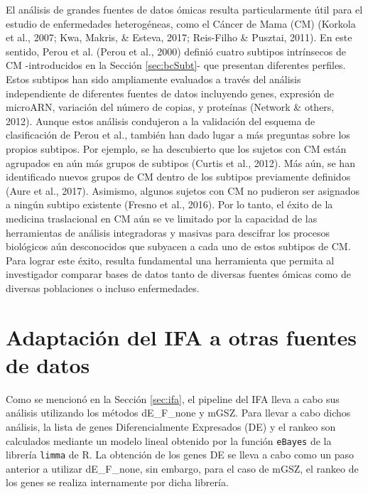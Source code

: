 \documentclass[12pt,twoside]{reedthesis}
\begin{document}
\par

El análisis de grandes fuentes de datos ómicas resulta particularmente útil para el estudio de enfermedades heterogéneas, como el Cáncer de Mama (CM) (Korkola et al., 2007; Kwa, Makris, \& Esteva, 2017; Reis-Filho \& Pusztai, 2011). En este sentido, Perou et al. (Perou et al., 2000) definió cuatro subtipos intrínsecos de CM -introducidos en la Sección \ref{sec:bcSubt}- que presentan diferentes perfiles. Estos subtipos han sido ampliamente evaluados a través del análisis independiente de diferentes fuentes de datos incluyendo genes, expresión de microARN, variación del número de copias, y proteínas (Network \& others, 2012). Aunque estos análisis condujeron a la validación del esquema de clasificación de Perou et al., también han dado lugar a más preguntas sobre los propios subtipos. Por ejemplo, se ha descubierto que los sujetos con CM están agrupados en aún más grupos de subtipos (Curtis et al., 2012). Más aún, se han identificado nuevos grupos de CM dentro de los subtipos previamente definidos (Aure et al., 2017). Asimismo, algunos sujetos con CM no pudieron ser asignados a ningún subtipo existente (Fresno et al., 2016). Por lo tanto, el éxito de la medicina traslacional en CM aún se ve limitado por la capacidad de las herramientas de análisis integradoras y masivas para descifrar los procesos biológicos aún desconocidos que subyacen a cada uno de estos subtipos de CM. Para lograr este éxito, resulta fundamental una herramienta que permita al investigador comparar bases de datos tanto de diversas fuentes ómicas como de diversas poblaciones o incluso enfermedades.

\hypertarget{sec:voom}{%
\section{Adaptación del IFA a otras fuentes de datos}\label{sec:voom}}

\par

Como se mencionó en la Sección \ref{sec:ifa}, el pipeline del IFA lleva a cabo sus análisis utilizando los métodos dE\_F\_none y mGSZ. Para llevar a cabo dichos análisis, la lista de genes Diferencialmente Expresados (DE) y el rankeo son calculados mediante un modelo lineal obtenido por la función \texttt{eBayes} de la librería \texttt{limma} de R. La obtención de los genes DE se lleva a cabo como un paso anterior a utilizar dE\_F\_none, sin embargo, para el caso de mGSZ, el rankeo de los genes se realiza internamente por dicha librería.
\end{document}
